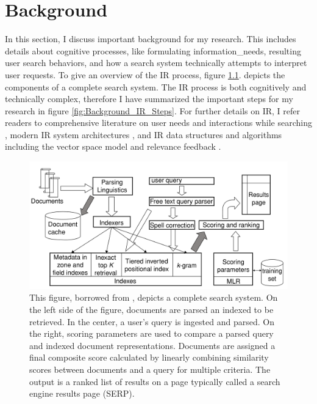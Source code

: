 \chapter{Background} \label{ch:[chapter 2 label]}

In this section, I discuss important background for my research. This includes details about cognitive processes, like formulating \gls{information_need}s, resulting user search behaviors, and how a search system technically attempts to interpret user requests. To give an overview of the IR process, figure \ref{fig:Background_Complete_Search_System}. depicts the components of a complete search system. The IR  process is both cognitively and technically complex, therefore I have summarized the important steps for my research in figure \ref{fig:Background_IR_Steps}. For further details on IR, I refer readers to comprehensive literature on user needs and interactions while searching \cite{White2016}, modern IR system architectures \cite{Baeza-Yates1999}, and IR data structures and algorithms including the vector space model and relevance feedback \cite{Buckley1985}.

\begin{figure}
    \centering
    \includegraphics[width=1\textwidth]{../figures/Background_Complete_Search_System.png}
    \caption{This figure, borrowed from \cite{Manning2008}, depicts a complete search system. On the left side of the figure, documents are parsed an indexed to be retrieved. In the center, a user’s query is ingested and parsed. On the right, scoring parameters are used to compare a parsed query and indexed document representations. Documents are assigned a final composite score calculated by linearly combining similarity scores between documents and a query for multiple criteria. The output is a ranked list of results on a page typically called a search engine results page (SERP).}
    \label{fig:Background_Complete_Search_System}
\end{figure}

